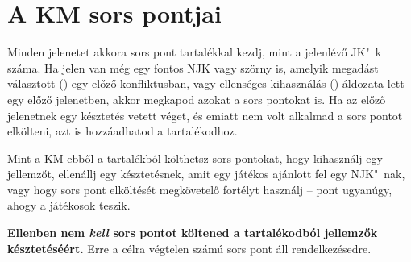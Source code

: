 \label{A KM sors pontjai}
\section{A KM sors pontjai}

Minden jelenetet akkora sors pont tartalékkal kezdj, mint a jelenlévő JK"~k száma. Ha jelen van még egy fontos NJK vagy szörny is, amelyik megadást választott () egy előző konfliktusban, vagy ellenséges kihasználás () áldozata lett egy előző jelenetben, akkor megkapod azokat a sors pontokat is. Ha az előző jelenetnek egy késztetés vetett véget, és emiatt nem volt alkalmad a sors pontot elkölteni, azt is hozzáadhatod a tartalékodhoz.


Mint a KM ebből a tartalékból költhetsz sors pontokat, hogy kihasználj egy jellemzőt, ellenállj egy késztetésnek, amit egy játékos ajánlott fel egy NJK"~nak, vagy hogy sors pont elköltését megkövetelő fortélyt használj -- pont ugyanúgy, ahogy a játékosok teszik.

\textbf{Ellenben nem \emph{kell} sors pontot költened a tartalékodból jellemzők késztetéséért.} Erre a célra végtelen számú sors pont áll rendelkezésedre.
